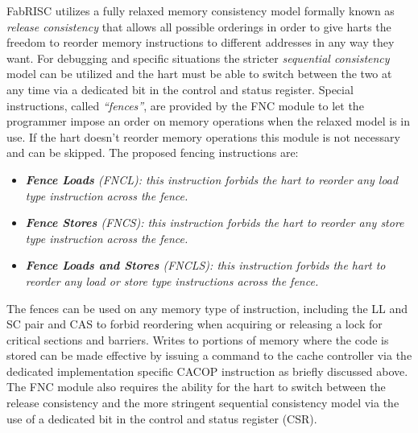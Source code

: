        \vspace{10pt}

        FabRISC utilizes a fully relaxed memory consistency model formally known as \textit{release consistency} that allows all possible orderings in order to give harts the freedom to reorder memory instructions to different addresses in any way they want. For debugging and specific situations the stricter \textit{sequential consistency} model can be utilized and the hart must be able to switch between the two at any time via a dedicated bit in the control and status register. Special instructions, called \textit{``fences''}, are provided by the FNC module to let the programmer impose an order on memory operations when the relaxed model is in use. If the hart doesn't reorder memory operations this module is not necessary and can be skipped. The proposed fencing instructions are:

        \begin{itemize}

            \item \textit{\textbf{Fence Loads} (FNCL): this instruction forbids the hart to reorder any load type instruction across the fence.}

            \item \textit{\textbf{Fence Stores} (FNCS): this instruction forbids the hart to reorder any store type instruction across the fence.}

            \item \textit{\textbf{Fence Loads and Stores} (FNCLS): this instruction forbids the hart to reorder any load or store type instructions across the fence.}

        \end{itemize}

        The fences can be used on any memory type of instruction, including the LL and SC pair and CAS to forbid reordering when acquiring or releasing a lock for critical sections and barriers. Writes to portions of memory where the code is stored can be made effective by issuing a command to the cache controller via the dedicated implementation specific CACOP instruction as briefly discussed above. The FNC module also requires the ability for the hart to switch between the release consistency and the more stringent sequential consistency model via the use of a dedicated bit in the control and status register (CSR).

